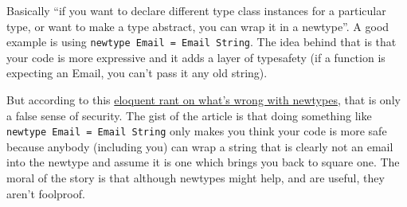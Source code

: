 \documentclass[12pt]{article}
\begin{document}
Basically ``if you want to declare different type class instances for a
particular type, or want to make a type abstract, you can wrap it in a
newtype''. A good example is using
\texttt{newtype\ Email\ =\ Email\ String}. The idea behind that is that
your code is more expressive and it adds a layer of typesafety (if a
function is expecting an Email, you can't pass it any old string).

But according to this
\href{http://degoes.net/articles/newtypes-suck/}{eloquent rant on what's
wrong with newtypes}, that is only a false sense of security. The gist
of the article is that doing something like
\texttt{newtype\ Email\ =\ Email\ String} only makes you think your code
is more safe because anybody (including you) can wrap a string that is
clearly not an email into the newtype and assume it is one which brings
you back to square one. The moral of the story is that although newtypes
might help, and are useful, they aren't foolproof.
\end{document}
